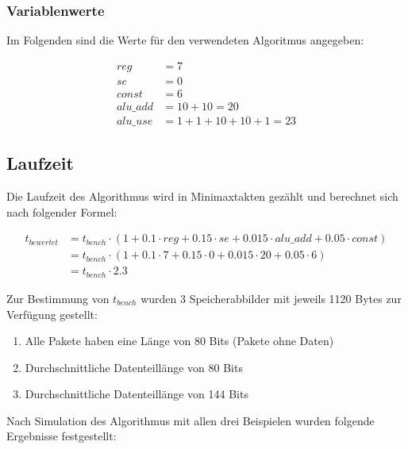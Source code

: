 \subsubsection{Variablenwerte}
\label{subsubsection:Dokumentation-BenchmarkBewertung-Berechnung-Variablen-Variablenwerte}


Im Folgenden sind die Werte für den verwendeten Algoritmus angegeben:

\begin{align*}
    reg      &= 7 \\
    se       &= 0 \\
    const    &= 6 \\
    alu\_add &= 10 + 10 = 20 \\
    alu\_use &= 1 + 1 + 10 + 10 + 1 = 23
\end{align*}

\subsection{Laufzeit}
\label{subsection:Dokumentation-BenchmarkBewertung-Berechnung-Laufzeit}

Die Laufzeit des Algorithmus wird in Minimaxtakten gezählt und berechnet sich nach folgender Formel:

\begin{align*}
    t_{bewertet} &= t_{bench} \cdot (1 + 0.1 \cdot reg + 0.15 \cdot se + 0.015 \cdot alu\_add + 0.05 \cdot const) \\
                 &= t_{bench} \cdot (1 + 0.1 \cdot 7 + 0.15 \cdot 0 + 0.015 \cdot 20 + 0.05 \cdot 6) \\
                 &= t_{bench} \cdot 2.3
\end{align*}

Zur Bestimmung von $t_{bench}$ wurden 3 Speicherabbilder mit jeweils 1120 Bytes zur Verfügung gestellt:

\begin{enumerate}
    \item Alle Pakete haben eine Länge von 80 Bits (Pakete ohne Daten)
    \item Durchschnittliche Datenteillänge von 80 Bits
    \item Durchschnittliche Datenteillänge von 144 Bits
\end{enumerate}

Nach Simulation des Algorithmus mit allen drei Beispielen wurden folgende Ergebnisse festgestellt: 

